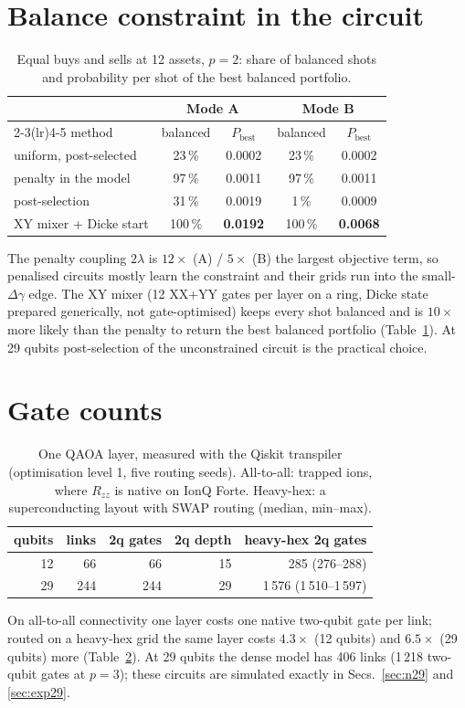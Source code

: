 \documentclass[10pt,twocolumn]{article}
\begin{document}
\section{Balance constraint in the circuit}
\begin{table}[!htb]\centering\footnotesize\setlength{\tabcolsep}{3pt}
\caption{Equal buys and sells at 12 assets, $p=2$: share of balanced shots and probability per shot of the best balanced portfolio.}
\label{tab:balance}
\begin{tabular}{@{}lcccc@{}}\toprule
 & \multicolumn{2}{c}{Mode A} & \multicolumn{2}{c}{Mode B}\\
\cmidrule(lr){2-3}\cmidrule(lr){4-5}
method & balanced & $P_{\mathrm{best}}$ & balanced & $P_{\mathrm{best}}$\\\midrule
uniform, post-selected & 23\,\% & 0.0002 & 23\,\% & 0.0002\\
penalty in the model & 97\,\% & 0.0011 & 97\,\% & 0.0011\\
post-selection & 31\,\% & 0.0019 & 1\,\% & 0.0009\\
XY mixer + Dicke start & 100\,\% & \textbf{0.0192} & 100\,\% & \textbf{0.0068}\\\bottomrule
\end{tabular}
\end{table}
The penalty coupling $2\lambda$ is $12\times$ (A) / $5\times$ (B) the largest objective term, so penalised circuits mostly learn the constraint and their grids run into the small-$\Delta\gamma$ edge. The XY mixer (12 XX+YY gates per layer on a ring, Dicke state prepared generically, not gate-optimised) keeps every shot balanced and is $10\times$ more likely than the penalty to return the best balanced portfolio (Table~\ref{tab:balance}). At 29 qubits post-selection of the unconstrained circuit is the practical choice.

\section{Gate counts}
\begin{table}[!htb]\centering\small\setlength{\tabcolsep}{4pt}
\caption{One QAOA layer, measured with the Qiskit transpiler (optimisation level 1, five routing seeds). All-to-all: trapped ions, where $R_{zz}$ is native on IonQ Forte. Heavy-hex: a superconducting layout with SWAP routing (median, min--max).}
\label{tab:gates}
\begin{tabular}{@{}rrrrr@{}}\toprule
qubits & links & 2q gates & 2q depth & heavy-hex 2q gates\\\midrule
12 & 66 & 66 & 15 & 285 (276--288)\\
29 & 244 & 244 & 29 & 1\,576 (1\,510--1\,597)\\\bottomrule
\end{tabular}
\end{table}
On all-to-all connectivity one layer costs one native two-qubit gate per link; routed on a heavy-hex grid the same layer costs $4.3\times$ (12 qubits) and $6.5\times$ (29 qubits) more (Table~\ref{tab:gates}). At 29 qubits the dense model has 406 links (1\,218 two-qubit gates at $p=3$); these circuits are simulated exactly in Secs.~\ref{sec:n29} and \ref{sec:exp29}.
\end{document}
